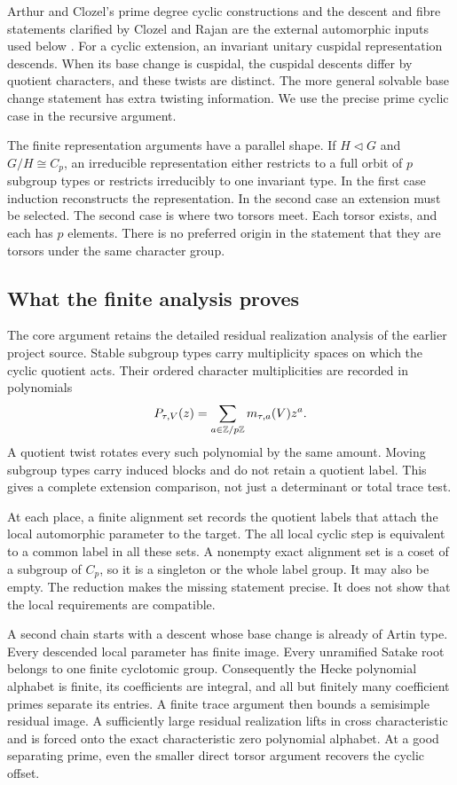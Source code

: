Arthur and Clozel's prime degree cyclic constructions and the descent and fibre statements clarified by Clozel and Rajan are the external automorphic inputs used below \cite{ArthurClozel1989,ClozelRajan2020}. For a cyclic extension, an invariant unitary cuspidal representation descends. When its base change is cuspidal, the cuspidal descents differ by quotient characters, and these twists are distinct. The more general solvable base change statement has extra twisting information. We use the precise prime cyclic case in the recursive argument.

The finite representation arguments have a parallel shape. If \(H\triangleleft G\) and \(G/H\cong C_p\), an irreducible representation either restricts to a full orbit of \(p\) subgroup types or restricts irreducibly to one invariant type. In the first case induction reconstructs the representation. In the second case an extension must be selected. The second case is where two torsors meet. Each torsor exists, and each has \(p\) elements. There is no preferred origin in the statement that they are torsors under the same character group.

\subsection{What the finite analysis proves}

The core argument retains the detailed residual realization analysis of the earlier project source. Stable subgroup types carry multiplicity spaces on which the cyclic quotient acts. Their ordered character multiplicities are recorded in polynomials
\[
 P_{\tau,V}(z)=\sum_{a\in\mathbb Z/p\mathbb Z}m_{\tau,a}(V)z^a.
\]
A quotient twist rotates every such polynomial by the same amount. Moving subgroup types carry induced blocks and do not retain a quotient label. This gives a complete extension comparison, not just a determinant or total trace test.

At each place, a finite alignment set records the quotient labels that attach the local automorphic parameter to the target. The all local cyclic step is equivalent to a common label in all these sets. A nonempty exact alignment set is a coset of a subgroup of \(C_p\), so it is a singleton or the whole label group. It may also be empty. The reduction makes the missing statement precise. It does not show that the local requirements are compatible.

A second chain starts with a descent whose base change is already of Artin type. Every descended local parameter has finite image. Every unramified Satake root belongs to one finite cyclotomic group. Consequently the Hecke polynomial alphabet is finite, its coefficients are integral, and all but finitely many coefficient primes separate its entries. A finite trace argument then bounds a semisimple residual image. A sufficiently large residual realization lifts in cross characteristic and is forced onto the exact characteristic zero polynomial alphabet. At a good separating prime, even the smaller direct torsor argument recovers the cyclic offset.

